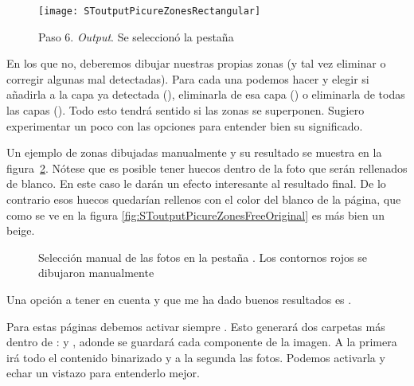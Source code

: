 \documentclass[%
	a5paper,
	10pt,
	twoside,
	openright,
	final,
]{memoir}
\begin{document}
{	\begin{figure}
		\centering
		\texttt{[image: SToutputPicureZonesRectangular]}
		\caption[Paso 6. \emph{Output}]{Paso 6. \emph{Output}. Se seleccionó la pestaña \label{fig:SToutputPicureZonesRectangular}}
	\end{figure}

	En los que no, deberemos dibujar nuestras propias zonas (y tal vez eliminar o corregir algunas mal detectadas). Para cada una podemos hacer  y elegir si añadirla a la capa ya detectada (), eliminarla de esa capa () o eliminarla de todas las capas (). Todo esto tendrá sentido si las zonas se superponen. Sugiero experimentar un poco con las opciones para entender bien su significado.

	Un ejemplo de zonas dibujadas manualmente y su resultado se muestra en la figura~\ref{fig:SToutputPicureZonesFree}. Nótese que es posible tener huecos dentro de la foto que serán rellenados de blanco. En este caso le darán un efecto interesante al resultado final. De lo contrario esos huecos quedarían rellenos con el color del blanco de la página, que como se ve en la figura \ref{fig:SToutputPicureZonesFreeOriginal} es más bien un beige.

	\begin{figure}
		\caption[Selección manual en la pestaña \texttt{Picture Zones}]{Selección manual de las fotos en la pestaña . Los contornos rojos se dibujaron manualmente\label{fig:SToutputPicureZonesFree}}
	\end{figure}

	Una opción a tener en cuenta y que me ha dado buenos resultados es .

	Para estas páginas debemos activar siempre . Esto generará dos carpetas más dentro de :  y , adonde se guardará cada componente de la imagen. A la primera irá todo el contenido binarizado y a la segunda las fotos. Podemos activarla y echar un vistazo para entenderlo mejor.

}
\end{document}
